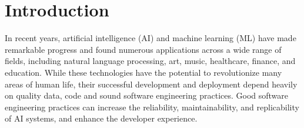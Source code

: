 
\section{Introduction}

In recent years, artificial intelligence (AI) and machine learning (ML) have made remarkable progress and found numerous applications across a wide range of fields, including natural language processing, art, music, healthcare, finance, and education. 
While these technologies have the potential to revolutionize many areas of human life, their successful development and deployment depend heavily on quality data, code and sound software engineering practices. Good software engineering practices can increase the reliability, maintainability, and replicability of AI systems, and enhance the developer experience. 



